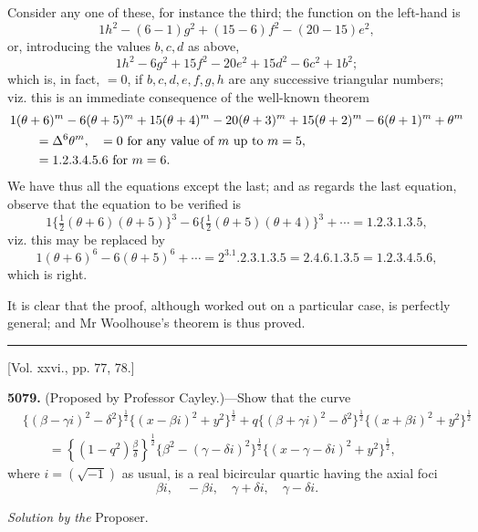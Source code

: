 \documentclass[10pt,twoside]{article}
\begin{document}
Consider any one of these, for instance the third; the function on the
left-hand is
\[
        1h^2-(6-1)g^2+(15-6)f^2-(20-15)e^2,
\]
or, introducing the values \(b,c,d\) as above,
\[
        1h^2-6g^2+15f^2-20e^2+15d^2-6c^2+1b^2;
\]
which is, in fact, \(=0\), if \(b,c,d,e,f,g,h\) are any successive triangular
numbers; viz. this is an immediate consequence of the well-known theorem
\[
\begin{aligned}
&1(\theta+6)^m-6(\theta+5)^m+15(\theta+4)^m-20(\theta+3)^m
 +15(\theta+2)^m-6(\theta+1)^m+\theta^m\\
&\qquad=\Delta^6\theta^m,\quad =0\hbox{ for any value of }m\hbox{ up to }m=5,
\\
&\qquad=1.2.3.4.5.6\hbox{ for }m=6.
\end{aligned}
\]
We have thus all the equations except the last; and as regards the last
equation, observe that the equation to be verified is
\[
1\{\tfrac12(\theta+6)(\theta+5)\}^3
-6\{\tfrac12(\theta+5)(\theta+4)\}^3+\cdots=1.2.3.1.3.5,
\]
viz. this may be replaced by
\[
1(\theta+6)^6-6(\theta+5)^6+\cdots
=2^3.1.2.3.1.3.5=2.4.6.1.3.5=1.2.3.4.5.6,
\]
which is right.

It is clear that the proof, although worked out on a particular case, is
perfectly general; and Mr Woolhouse's theorem is thus proved.

\begin{center}
\rule{0.32\linewidth}{0.4pt}

[Vol. xxvi., pp. 77, 78.]
\end{center}

\noindent\textbf{5079.} (Proposed by Professor Cayley.)---Show that the curve
\[
\begin{aligned}
&\{(\beta-\gamma i)^2-\delta^2\}^{\frac12}
  \{(x-\beta i)^2+y^2\}^{\frac12}
 +q\{(\beta+\gamma i)^2-\delta^2\}^{\frac12}
  \{(x+\beta i)^2+y^2\}^{\frac12}\\
&\qquad=
\left\{(1-q^2)\frac{\beta}{\delta}\right\}^{\frac12}
\{\beta^2-(\gamma-\delta i)^2\}^{\frac12}
\{(x-\gamma-\delta i)^2+y^2\}^{\frac12},
\end{aligned}
\]
where \(i=(\sqrt{-1})\) as usual, is a real bicircular quartic having the axial
foci
\[
        \beta i,\quad -\beta i,\quad \gamma+\delta i,\quad \gamma-\delta i.
\]

\newpage

\begin{center}
\textit{Solution by the} Proposer.
\end{center}
\end{document}
